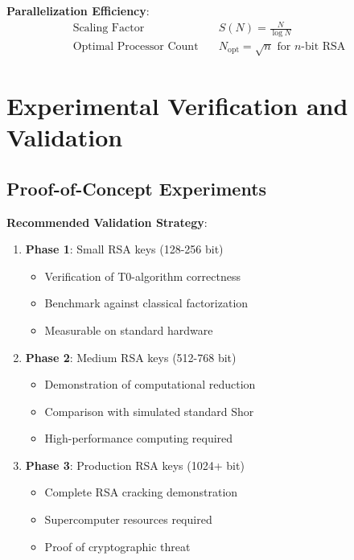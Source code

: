 \documentclass[12pt,a4paper]{article}
\begin{document}
	\textbf{Parallelization Efficiency}:
	\begin{align}
		\text{Scaling Factor} \quad &S(N) = \frac{N}{\log N} \\
		\text{Optimal Processor Count} \quad &N_{\text{opt}} = \sqrt{n} \text{ for } n\text{-bit RSA}
	\end{align}
	
	\section{Experimental Verification and Validation}
	
	\subsection{Proof-of-Concept Experiments}
	
	\textbf{Recommended Validation Strategy}:
	
	\begin{enumerate}
		\item \textbf{Phase 1}: Small RSA keys (128-256 bit)
		\begin{itemize}
			\item Verification of T0-algorithm correctness
			\item Benchmark against classical factorization
			\item Measurable on standard hardware
		\end{itemize}
		
		\item \textbf{Phase 2}: Medium RSA keys (512-768 bit)
		\begin{itemize}
			\item Demonstration of computational reduction
			\item Comparison with simulated standard Shor
			\item High-performance computing required
		\end{itemize}
		
		\item \textbf{Phase 3}: Production RSA keys (1024+ bit)
		\begin{itemize}
			\item Complete RSA cracking demonstration
			\item Supercomputer resources required
			\item Proof of cryptographic threat
		\end{itemize}
	\end{enumerate}
	
\end{document}
